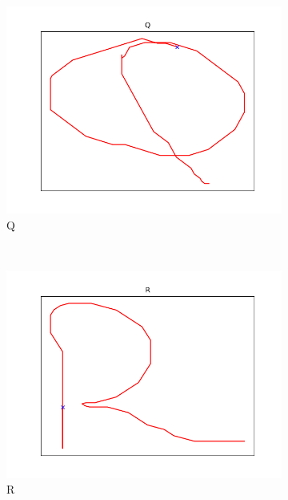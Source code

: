 \begin{figure}
\begin{subfigure}[b]{0.14\textwidth}
        \includegraphics[width=\textwidth]{images/gbem/letters_generated/Q.png}
        \caption{Q}
    \end{subfigure}
    ~
    \begin{subfigure}[b]{0.14\textwidth}
        \includegraphics[width=\textwidth]{images/gbem/letters_generated/R.png}
        \caption{R}
    \end{subfigure}
    ~
    \begin{subfigure}[b]{0.14\textwidth}

\end{subfigure}
\end{figure}
